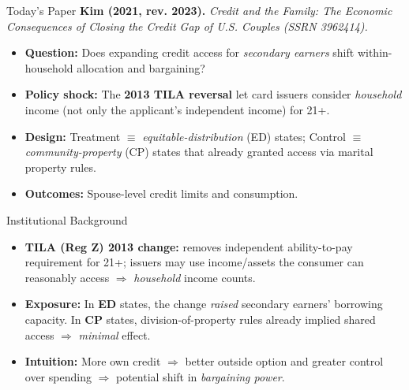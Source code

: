 \documentclass[11pt,notes=hide,aspectratio=169,mathserif]{beamer}
\begin{document}
\begin{frame}{Today's Paper}
\textbf{Kim (2021, rev. 2023).} \emph{Credit and the Family: The Economic Consequences of Closing the Credit Gap of U.S. Couples (SSRN 3962414).}\\[0.4em]
\small
\begin{itemize}
  \item \textbf{Question:} Does expanding credit access for \emph{secondary earners} shift within-household allocation and bargaining?
  \item \textbf{Policy shock:} The \textbf{2013 TILA reversal} let card issuers consider \emph{household} income (not only the applicant’s independent income) for 21+.
  \item \textbf{Design:} Treatment \(\equiv\) \emph{equitable-distribution} (ED) states; Control \(\equiv\) \emph{community-property} (CP) states that already granted access via marital property rules.
  \item \textbf{Outcomes:} Spouse-level credit limits and consumption.
\end{itemize}
\end{frame}

\begin{frame}{Institutional Background}
\small
\begin{itemize}
  \item \textbf{TILA (Reg Z) 2013 change:} removes independent ability-to-pay requirement for 21+; issuers may use income/assets the consumer can reasonably access \(\Rightarrow\) \emph{household} income counts.
  \item \textbf{Exposure:} In \textbf{ED} states, the change \emph{raised} secondary earners' borrowing capacity. In \textbf{CP} states, division-of-property rules already implied shared access \(\Rightarrow\) \emph{minimal} effect.
  \item \textbf{Intuition:} More own credit \(\Rightarrow\) better outside option and greater control over spending \(\Rightarrow\) potential shift in \emph{bargaining power}.
\end{itemize}
\end{frame}
\end{document}
